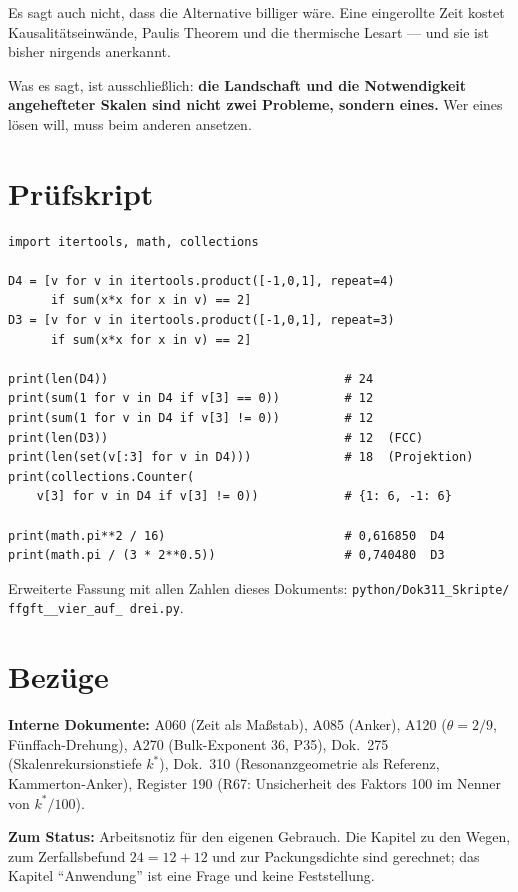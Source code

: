 Es sagt auch nicht, dass die Alternative billiger wäre. Eine
eingerollte Zeit kostet Kausalitätseinwände, Paulis Theorem und die
thermische Lesart --- und sie ist bisher nirgends anerkannt.

Was es sagt, ist ausschließlich: \textbf{die Landschaft und die
Notwendigkeit angehefteter Skalen sind nicht zwei Probleme, sondern
eines.} Wer eines lösen will, muss beim anderen ansetzen.

\chapter{Prüfskript}

\begin{verbatim}
import itertools, math, collections

D4 = [v for v in itertools.product([-1,0,1], repeat=4)
      if sum(x*x for x in v) == 2]
D3 = [v for v in itertools.product([-1,0,1], repeat=3)
      if sum(x*x for x in v) == 2]

print(len(D4))                                 # 24
print(sum(1 for v in D4 if v[3] == 0))         # 12
print(sum(1 for v in D4 if v[3] != 0))         # 12
print(len(D3))                                 # 12  (FCC)
print(len(set(v[:3] for v in D4)))             # 18  (Projektion)
print(collections.Counter(
    v[3] for v in D4 if v[3] != 0))            # {1: 6, -1: 6}

print(math.pi**2 / 16)                         # 0,616850  D4
print(math.pi / (3 * 2**0.5))                  # 0,740480  D3
\end{verbatim}

Erweiterte Fassung mit allen Zahlen dieses Dokuments:
\texttt{python/\allowbreak Dok311\_\allowbreak Skripte/\allowbreak
ffgft\_\_\allowbreak vier\_\allowbreak auf\_\allowbreak
drei.py}.

\chapter{Bezüge}

\textbf{Interne Dokumente:} A060 (Zeit als Maßstab), A085 (Anker),
A120 ($\theta = 2/9$, Fünffach-Drehung), A270 (Bulk-Exponent 36, P35),
Dok.~275 (Skalenrekursionstiefe $k^*$), Dok.~310 (Resonanzgeometrie als
Referenz, Kammerton-Anker), Register 190 (R67: Unsicherheit des Faktors
100 im Nenner von $k^*/100$).

\medskip
\noindent\textbf{Zum Status:} Arbeitsnotiz für den eigenen Gebrauch.
Die Kapitel zu den Wegen, zum Zerfallsbefund $24 = 12+12$ und zur
Packungsdichte sind gerechnet; das Kapitel \enquote{Anwendung} ist eine
Frage und keine Feststellung.


